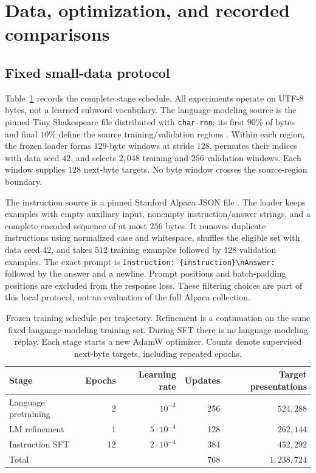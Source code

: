\documentclass{article}
\begin{document}
\section{Data, optimization, and recorded comparisons}
\label{sec:protocol}
\subsection{Fixed small-data protocol}
Table~\ref{tab:protocol} records the complete stage schedule. All experiments operate on UTF-8 bytes, not a learned subword vocabulary. The language-modeling source is the pinned Tiny Shakespeare file distributed with \texttt{char-rnn}; its first $90\%$ of bytes and final $10\%$ define the source training/validation regions \citep{karpathy2015charrnn}. Within each region, the frozen loader forms $129$-byte windows at stride $128$, permutes their indices with data seed $42$, and selects $2{,}048$ training and $256$ validation windows. Each window supplies $128$ next-byte targets. No byte window crosses the source-region boundary.

The instruction source is a pinned Stanford Alpaca JSON file \citep{taori2023alpaca}. The loader keeps examples with empty auxiliary input, nonempty instruction/answer strings, and a complete encoded sequence of at most $256$ bytes. It removes duplicate instructions using normalized case and whitespace, shuffles the eligible set with data seed $42$, and takes $512$ training examples followed by $128$ validation examples. The exact prompt is \texttt{Instruction: \{instruction\}\textbackslash nAnswer: } followed by the answer and a newline. Prompt positions and batch-padding positions are excluded from the response loss. These filtering choices are part of this local protocol, not an evaluation of the full Alpaca collection.

\begin{table}[t]
\centering
\caption{Frozen training schedule per trajectory. Refinement is a continuation on the same fixed language-modeling training set. During SFT there is no language-modeling replay. Each stage starts a new AdamW optimizer. Counts denote supervised next-byte targets, including repeated epochs.}
\label{tab:protocol}
\begin{tabular}{lrrrr}
\toprule
Stage & Epochs & Learning rate & Updates & Target presentations\\
\midrule
Language pretraining & 2 & $10^{-3}$ & 256 & $524{,}288$\\
LM refinement & 1 & $5\cdot10^{-4}$ & 128 & $262{,}144$\\
Instruction SFT & 12 & $2\cdot10^{-4}$ & 384 & $452{,}292$\\
\midrule
Total & & & 768 & $1{,}238{,}724$\\
\bottomrule
\end{tabular}
\end{table}
\end{document}
